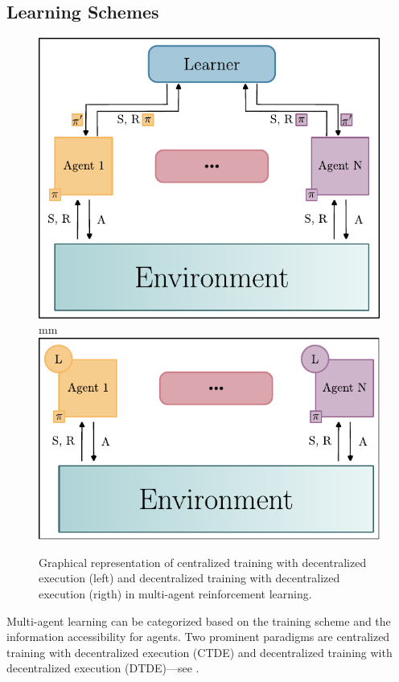 \documentclass[sigconf]{acmart}
\begin{document}
\subsection{Learning Schemes}
\begin{figure}
  \centering
  \includegraphics[width=0.7\linewidth]{figures/CTDE.pdf}
   mm
  \includegraphics[width=0.7\linewidth]{figures/DTDE.pdf}
  \caption{Graphical representation of centralized training with decentralized execution (left) and decentralized training with decentralized execution (rigth) in multi-agent reinforcement learning.}
  \label{fig:learning_paradigms}
\end{figure}
Multi-agent learning can be categorized based on the training scheme and the information accessibility for agents. 
Two prominent paradigms are centralized training with decentralized execution (CTDE) and decentralized training with decentralized execution (DTDE)---see .
\end{document}
